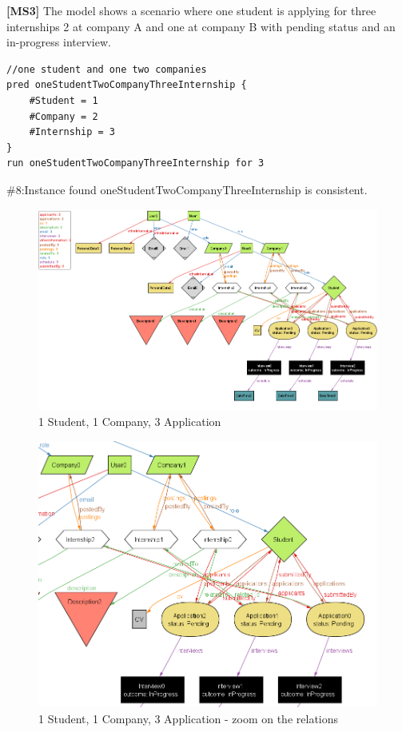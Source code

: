 \textbf{[MS3]} The model shows a scenario where one student is applying for three internships 2 at company A and one at company B with pending status and an in-progress interview.
\begin{lstlisting}
//one student and one two companies
pred oneStudentTwoCompanyThreeInternship {
    #Student = 1
    #Company = 2
    #Internship = 3
}
run oneStudentTwoCompanyThreeInternship for 3 
\end{lstlisting}
{ \#8:Instance found oneStudentTwoCompanyThreeInternship is consistent.}
\begin{figure}[H]
    \centering
    \includegraphics[width=1\linewidth]{RASD//Images/1st2com.png}
    \caption{1 Student, 1 Company, 3 Application}
    \label{fig:enter-label}
\end{figure}
\begin{figure}[H]
    \centering
    \includegraphics[width=0.75\linewidth]{RASD//Images/1st2comzoom.png}
    \caption{1 Student, 1 Company, 3 Application - zoom on the relations}
    \label{fig:enter-label}
\end{figure}

